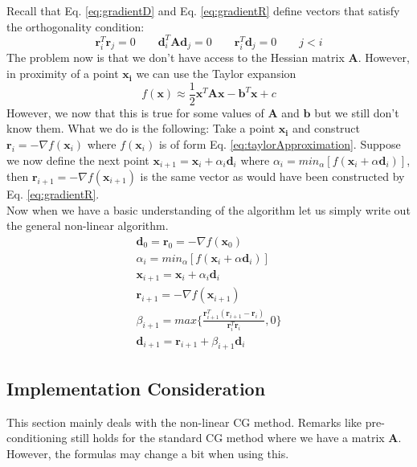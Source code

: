 \documentclass[a4paper,10pt]{article}
\theoremstyle{definition}
\begin{document}
Recall that Eq. \ref{eq:gradientD} and Eq. \ref{eq:gradientR} define vectors that satisfy the orthogonality condition:
\begin{equation}
	\pmb{r}_i^T \pmb{r}_j = 0 \qquad \pmb{d}_i^T\pmb{A}\pmb{d}_j = 0 \qquad \pmb{r}_i^T \pmb{d}_j = 0 \qquad j < i 
\end{equation}
The problem now is that we don't have access to the Hessian matrix $\pmb{A}$. However, in proximity of a point $\pmb{x_i}$ we can use the Taylor expansion
\begin{equation}
	f(\pmb{x}) \approx \frac{1}{2}\pmb{x}^T\pmb{A}\pmb{x} - \pmb{b}^T\pmb{x} + c
	\label{eq:taylorApproximation}
\end{equation}
However, we now that this is true for some values of $\pmb{A}$ and $\pmb{b}$ but we still don't know them. What we do is the following: Take a point $\pmb{x_i}$ and construct $\pmb{r}_i = -\nabla f(\pmb{x}_i)$ where $f(\pmb{x}_i)$ is of form Eq. \ref{eq:taylorApproximation}. Suppose we now define the next point $\pmb{x}_{i+1} = \pmb{x}_{i} + \alpha_i \pmb{d}_{i} $ where $\alpha_i = min_{\alpha}[f(\pmb{x}_{i} + \alpha \pmb{d}_{i})]$, then $\pmb{r}_{i+1} = -\nabla f(\pmb{x}_{i+1})$ is the same vector as would have been constructed by Eq. \ref{eq:gradientR}. \\

Now when we have a basic understanding of the algorithm let us simply write out the general non-linear algorithm.
\begin{gather}
	\pmb{d}_0 = \pmb{r}_0 = - \nabla f(\pmb{x}_0) \\
	\alpha_i = min_{\alpha}[f(\pmb{x}_{i} + \alpha \pmb{d}_{i})] \\
	\pmb{x}_{i+1} = \pmb{x}_i + \alpha_i \pmb{d}_i \\
	\pmb{r}_{i+1} = -\nabla f(\pmb{x}_{i+1}) \\
	\beta_{i+1} = max \Big\{\frac{\pmb{r}^T_{i+1}(\pmb{r}_{i+1} - \pmb{r}_{i})}{\pmb{r}^T_{i}\pmb{r}_{i}}, 0\Big\} \\
	\pmb{d}_{i+1} = \pmb{r}_{i+1} + \beta_{i+1}\pmb{d}_i
\end{gather}

\subsection{Implementation Consideration}
This section mainly deals with the non-linear CG method. Remarks like pre-conditioning still holds for the standard CG method where we have a matrix $\pmb{A}$. However, the formulas may change a bit when using this.\\
\end{document}
